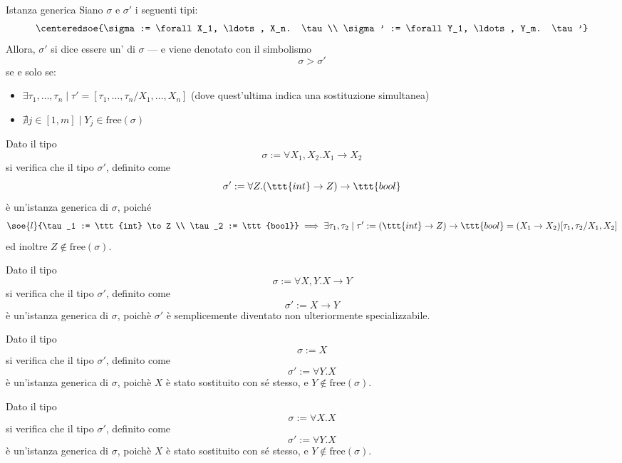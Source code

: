 \documentclass[a4paper, 12pt]{report}
\begin{document}
    \begin{frameddefn}{Istanza generica}
        Siano $\sigma$ e $\sigma'$ i seguenti tipi: $$\centeredsoe{\sigma := \forall X_1, \ldots, X_n. \tau \\ \sigma' := \forall Y_1, \ldots, Y_m. \tau'}$$ Allora, $\sigma'$ si dice essere un' di $\sigma$ --- e viene denotato con il simbolismo $$\sigma > \sigma '$$ se e solo se:

        \begin{itemize}
            \item $\exists \tau_1, \ldots, \tau_n \mid \tau' = [\tau_1, \ldots , \tau_n/X_1, \ldots, X_n]$ (dove quest'ultima indica una sostituzione simultanea)
            \item $\nexists j \in [1, m] \mid Y_j \in \mathrm{free}(\sigma)$
        \end{itemize}
    \end{frameddefn}

    \begin{example}
        Dato il tipo $$\sigma := \forall X_1, X_2.X_1 \to X_2$$ si verifica che il tipo $\sigma'$, definito come $$\sigma' := \forall Z. (\ttt{int} \to Z) \to \ttt{bool}$$ è un'istanza generica di $\sigma$, poiché $$\soe{l}{\tau_1 := \ttt{int} \to Z \\ \tau_2 := \ttt{bool}} \implies \exists \tau_1, \tau_2 \mid \tau' := (\ttt{int} \to Z) \to \ttt{bool} = (X_1 \to X_2)[\tau_1, \tau_2/X_1, X_2]$$ ed inoltre $Z \notin \mathrm{free}(\sigma)$.
    \end{example}

    \begin{example}
        Dato il tipo $$\sigma := \forall X,Y.X \to Y$$ si verifica che il tipo $\sigma'$, definito come $$\sigma' := X \to Y$$ è un'istanza generica di $\sigma$, poichè $\sigma'$ è semplicemente diventato non ulteriormente specializzabile.
    \end{example}

    \begin{example}
        Dato il tipo $$\sigma := X$$ si verifica che il tipo $\sigma'$, definito come $$\sigma' := \forall Y.X$$ è un'istanza generica di $\sigma$, poichè $X$ è stato sostituito con sé stesso, e $Y \notin \mathrm{free}(\sigma)$.
    \end{example}

    \begin{example}
        Dato il tipo $$\sigma := \forall X.X$$ si verifica che il tipo $\sigma'$, definito come $$\sigma' := \forall Y.X$$ è un'istanza generica di $\sigma$, poichè $X$ è stato sostituito con sé stesso, e $Y \notin \mathrm{free}(\sigma)$.
    \end{example}
\end{document}
